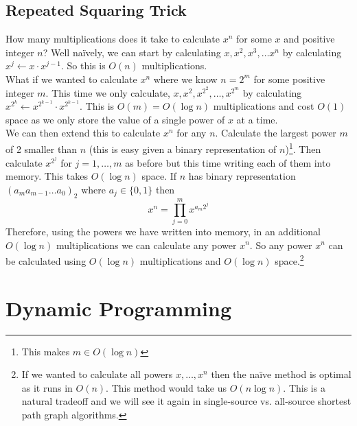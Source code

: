 \documentclass[10pt]{article}
\theoremstyle{plain}
\theoremstyle{definition}
\numberwithin{equation}{section}
\numberwithin{figure}{section}
\begin{document}
\subsection{Repeated Squaring Trick}
How many multiplications does it take to calculate $x^n$ for some $x$ and positive integer $n$? Well na\"ively, we can start by calculating $x, x^2, x^3, \ldots x^n$ by calculating $x^j \leftarrow x \cdot x^{j-1}$. So this is $O(n)$ multiplications. \\

\noindent What if we wanted to calculate $x^n$ where we know $n = 2^m$ for some positive integer $m$. This time we only calculate, $x, x^2, x^{2^2}, \dots, x^{2^m}$ by calculating $x^{2^k} \leftarrow x^{2^{k-1}} \cdot x^{2^{k-1}}$. This is $O(m) = O(\log n)$ multiplications and cost $O(1)$ space as we only store the value of a single power of $x$ at a time. \\

\noindent We can then extend this to calculate $x^n$ for any $n$. Calculate the largest power $m$ of 2 smaller than $n$ (this is easy given a binary representation of $n$)\footnote{This makes $m \in O(\log n)$}. Then calculate $x^{2^j}$ for $j = 1, \ldots, m$ as before but this time writing each of them into memory. This takes $O(\log n)$ space. If $n$ has binary representation $(a_m a_{m-1} \ldots a_0)_2$ where $a_j \in \{0, 1\}$ then 
\begin{equation}
x^n = \prod_{j = 0}^m x^{a_m 2^j}
\end{equation}
Therefore, using the powers we have written into memory, in an additional $O(\log n)$ multiplications we can calculate any power $x^n$. So any power $x^n$ can be calculated using $O(\log n)$ multiplications and $O(\log n)$ space.\footnote{If we wanted to calculate all powers $x, \ldots, x^n$ then the na\"ive method is optimal as it runs in $O(n)$. This method would take us $O(n \log n)$. This is a natural tradeoff and we will see it again in single-source vs. all-source shortest path graph algorithms.}



\newpage
\section{Dynamic Programming}
\end{document}
